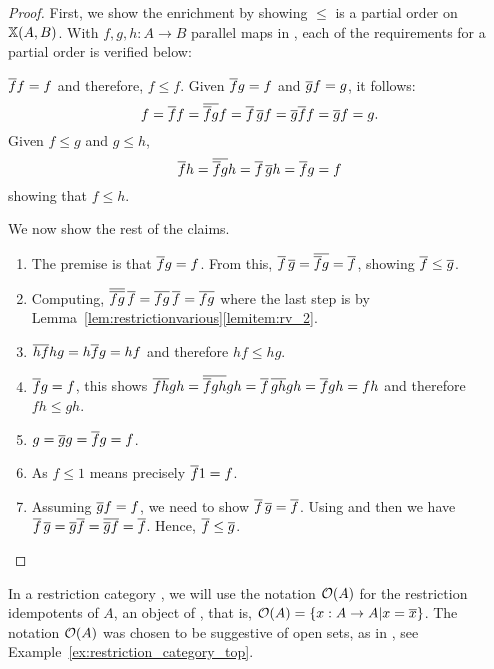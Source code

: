 \begin{proof}
  First, we show the enrichment by showing $\le$ is a partial order on $\mathbb{X}(A,B)$. With
  $f,g,h:A\to  B$ parallel maps in \X, each of the requirements for a partial order is
  verified below:
  \begin{description}
     $\overline{f} f = f$ and therefore, $ f \le f$.
     Given $\overline{f}g = f$ and $\overline{g}f = g$, it follows:
    \[
      f = \overline{f} f = \overline{\overline{f} g} f = \overline{f}\, \overline{g} f
      = \overline{g}\overline{f} f =  \overline{g} f = g.
    \]
     Given $f \le g$ and $g\le h$,
      \[
        \overline{f} h = \overline{\overline{f} g} h = \overline{f}\, \overline{g} h = \overline{f} g = f
      \]
    showing that $f \le h$.
  \end{description}

  We now show the rest of the claims.
  \begin{enumerate}[{(}i{)}]
    \item The premise is that $\overline{f} g = f$. From this, $ \overline{f}\, \overline{g} =
      \overline{\overline{f} g} = \overline{f}$, showing $\overline{f} \le \overline{g}$.
    \item Computing, $\overline{\overline{fg}}\,\overline{f} = \overline{fg}\, \overline{f} = \overline{fg}$ where the last step is by
      Lemma~\ref{lem:restrictionvarious}\ref{lemitem:rv_2}.
    \item $\overline{h f} h g = h \overline{f} g = h f$  and therefore $h f \le h g$.
    \item $\overline{f} g = f$, this shows $\overline{f h} g h = \overline{\overline{f} g h} g h
      = \overline{f}\, \overline{g h} g h = \overline{f} g h = f h$ and therefore $f h \le g h$.
    \item $g = \overline{g} g = \overline{f} g = f$.
    \item As $f \le 1$ means precisely $\overline{f}1 = f$.
    \item Assuming $\overline{g} f = f$, we need to show $\overline{f}\, \overline{g} = \overline{f}$. Using \rtwo and
      then \rthree we have $\overline{f}\,\overline{g} = \overline{g}\overline{f}  = \overline{\overline{g} f}  = \overline{f}$.
      Hence, $\overline{f} \le \overline{g}$.
  \end{enumerate}
\end{proof}

In a restriction category \X, we will use the notation $\mathcal{O}({A})$ for the restriction idempotents
of $A$, an object of \X, that is, $\mathcal{O}({A}) = \{x:A\to A| x = \overline{x}\}$. The notation $\mathcal{O}({A})$ was chosen
to be suggestive of open sets, as in \topcatp, see Example~\ref{ex:restriction_category_top}.

